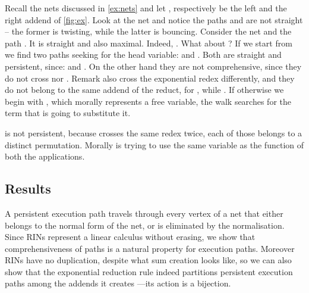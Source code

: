 \begin{example}\label{ex:path}
Recall the nets discussed in \autoref{ex:nets} and let
  ,
respectively be the left and the right addend of \autoref{fig:ex}.
Look at the net  and notice the paths  and  
are not straight -- the former is twisting, while the latter is bouncing.
Consider the net  and the path .
It is straight and also maximal.
Indeed, .
What about ?
If we start from  we find two paths seeking for the head variable:
   and
  .
Both are straight and persistent, since:
   and
  .
On the other hand they are not comprehensive, since they do not cross  nor 
.
Remark also  cross the exponential redex differently,
and they do not belong to the same addend of the reduct,
for , while .
If otherwise we begin with , which morally represents a free variable, 
the walk searches for the term that is going to substitute it.

is not persistent, because crosses the same redex twice, each of those belongs 
to a distinct permutation.
Morally  is trying to use the same variable as the function of both 
the applications.
\end{example}

\subsection{Results}

A persistent execution path travels through every vertex of a net that either 
belongs to the normal form of the net, or is eliminated by the normalisation.
Since RINs represent a linear calculus without erasing, we show that 
comprehensiveness of paths is a natural property for execution paths.
Moreover RINs have no duplication, despite what sum creation looks like,
so we can also show that the exponential reduction rule indeed partitions 
persistent execution paths among the addends it creates ---its action is a 
bijection.

